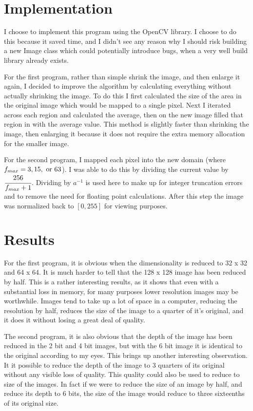 \documentclass[12pt,a4paper,oneside]{article}
\begin{document}
\section{Implementation}
  I choose to implement this program using the OpenCV library.  I choose to do this because
  it saved time, and I didn't see any reason why I should risk building a new Image class
  which could potentially introduce bugs, when a very well build library already exists.
  
  For the first program, rather than simple shrink the image, and then enlarge it again, I
  decided to improve the algorithm by calculating everything without actually shrinking the
  image.  To do this I first calculated the size of the area in the original image which
  would be mapped to a single pixel.  Next I iterated across each region and calculated the
  average, then on the new image filled that region in with the average value.  This method
  is slightly faster than shrinking the image, then enlarging it because it does not require
  the extra memory allocation for the smaller image.

  For the second program, I mapped each pixel into the new domain (where $f_{max} = 3, 15,
  \textup{ or } 63$).  I was able to do this by dividing the current value by
  $\cfrac{256}{f_{max}+1}$. Dividing by $a^{-1}$ is used here to make up for integer
  truncation errors and to remove the need for floating point calculations.  After this step
  the image was normalized back to $[0,255]$ for viewing purposes.

\section{Results}
  For the first program, it is obvious when the dimensionality is reduced to 32 x 32
  and 64 x 64.  It is much harder to tell that the 128 x 128 image has been reduced by
  half.  This is a rather interesting results, as it shows that even with a substantial
  loss in memory, for many purposes lower resolution images may be worthwhile.  Images
  tend to take up a lot of space in a computer, reducing the resolution by half, reduces
  the size of the image to a quarter of it's original, and it does it without losing a great
  deal of quality.

  The second program, it is also obvious that the depth of the image has been reduced in the
  2 bit and 4 bit images, but with the 6 bit image it is identical to the original according
  to my eyes.  This brings up another interesting observation.  It it possible to reduce the
  depth of the image to 3 quarters of its original without any visible loss of quality.  This
  quality could also be used to reduce to size of the images.  In fact if we were to reduce
  the size of an image by half, and reduce its depth to 6 bits, the size of the image would
  reduce to three sixteenths of its original size.
\end{document}
